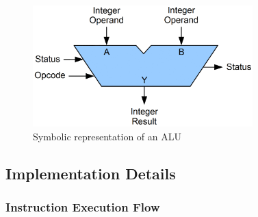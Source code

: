 \begin{enumerate}
\begin{figure}[h!]
\centering
\includegraphics[width=8.5cm]{figures/ALU_block.PNG}
\caption{Symbolic representation of an ALU}
\label{fig:riscv7}
\end{figure}
\end{enumerate}

\subsection{Implementation Details}
\label{sect6_4_3}

\subsubsection{Instruction Execution Flow}
\label{sect6_4_3_1}

